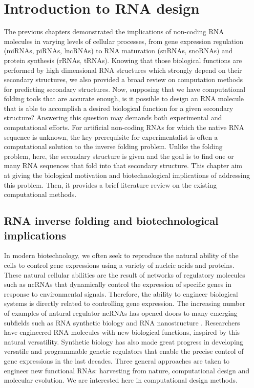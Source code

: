 \chapter{Introduction to RNA design}\label{ch:mathtest} %
The previous chapters demonstrated the implications of non-coding RNA molecules in varying levels of cellular processes, from gene expression regulation (miRNAs, piRNAs, lncRNAs) to RNA maturation (snRNAs, snoRNAs) and protein synthesis (rRNAs, tRNAs). Knowing that those biological functions are performed by high dimensional RNA structures which strongly depend on their secondary structures,  we also provided a broad review on computation methods for predicting secondary structures. Now, supposing that we have computational folding tools that are accurate enough, is it possible to design an RNA molecule that is able to accomplish a desired biological function for a given secondary structure? Answering this question may demands both experimental and computational efforts. For artificial non-coding RNAs for which the native RNA sequence is unknown, the key prerequisite for experimentalist is often a computational solution to the inverse folding problem. Unlike the folding problem, here, the secondary structure is given and the goal is to find one or many  RNA sequences that fold into that secondary structure. This chapter aim at giving the biological motivation and biotechnological implications of addressing this problem. Then, it provides a brief literature review on the existing computational methods. 

\section{RNA inverse folding and biotechnological implications}  

In modern biotechnology, we often seek to reproduce the natural ability of the cells to control gene expressions using a variety of nucleic acids and proteins. These natural cellular abilities are the result of networks of regulatory molecules such as ncRNAs that dynamically control the expression of specific genes in response to environmental signals. Therefore, the ability to engineer biological systems is directly related to controlling gene expression. The increasing number of examples of natural regulator ncRNAs has opened doors to many emerging subfields such as RNA synthetic biology \cite{chappell2015renaissance, isaacs2006rna} and RNA nanostructure \cite{jaeger2001tectorna, guo2010emerging}. Researchers have engineered RNA molecules with new biological functions, inspired by this natural versatility. Synthetic biology has also made great progress in developing versatile and programmable genetic regulators that enable the precise control of gene expressions in the last decades. Three general approaches are taken to engineer new functional RNAs: harvesting from nature, computational design and molecular evolution. We are interested here in computational design methods.

